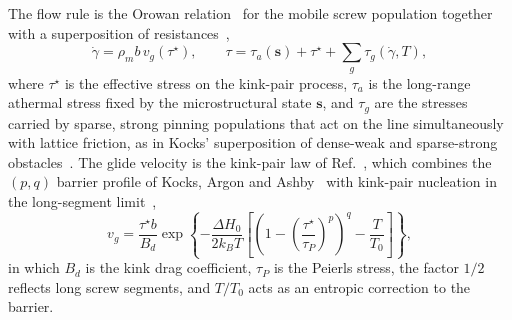 \documentclass[aps,prl,twocolumn,superscriptaddress,amsmath,amssymb,floatfix]{revtex4-2}
\newcommand{\gd}{\dot\gamma}
\newcommand{\ts}{\tau^{\star}}
\newcommand{\kT}{k_BT}
\begin{document}
The flow rule is the Orowan relation~\cite{Orowan1940} for the mobile screw population together with a superposition of resistances~\cite{Seeger,KocksArgonAshby},
\begin{equation}
\gd=\rho_m b\,v_g(\ts),\qquad \tau=\tau_a(\bm s)+\ts+\sum_g\tau_g(\gd,T),
\label{eq:flow}
\end{equation}
where $\ts$ is the effective stress on the kink-pair process, $\tau_a$ is the long-range athermal stress fixed by the microstructural state $\bm s$, and $\tau_g$ are the stresses carried by sparse, strong pinning populations that act on the line simultaneously with lattice friction, as in Kocks' superposition of dense-weak and sparse-strong obstacles~\cite{KocksArgonAshby}. The glide velocity is the kink-pair law of Ref.~\cite{Po2016}, which combines the $(p,q)$ barrier profile of Kocks, Argon and Ashby~\cite{KocksArgonAshby} with kink-pair nucleation in the long-segment limit~\cite{DornRajnak1964,HirthLothe},
\begin{equation}
v_g=\frac{\ts b}{B_d}\exp\!\left\{-\frac{\Delta H_0}{2\kT}\left[\left(1-\left(\frac{\ts}{\tau_P}\right)^{p}\right)^{q}-\frac{T}{T_0}\right]\right\},
\label{eq:vg}
\end{equation}
in which $B_d$ is the kink drag coefficient, $\tau_P$ is the Peierls stress, the factor $1/2$ reflects long screw segments, and $T/T_0$ acts as an entropic correction to the barrier.
\end{document}
